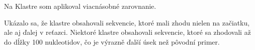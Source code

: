Na Klastre som aplikoval viacnásobné zarovnanie.

Ukázalo sa, že klastre obsahovali sekvencie, ktoré mali zhodu nielen na začiatku, ale aj ďalej v reťazci.
Niektoré klastre obsahovali sekvencie, ktoré sa zhodovali až do dĺžky 100 nukleotidov, čo je výrazně ďalší úsek než pôvodní primer.


%